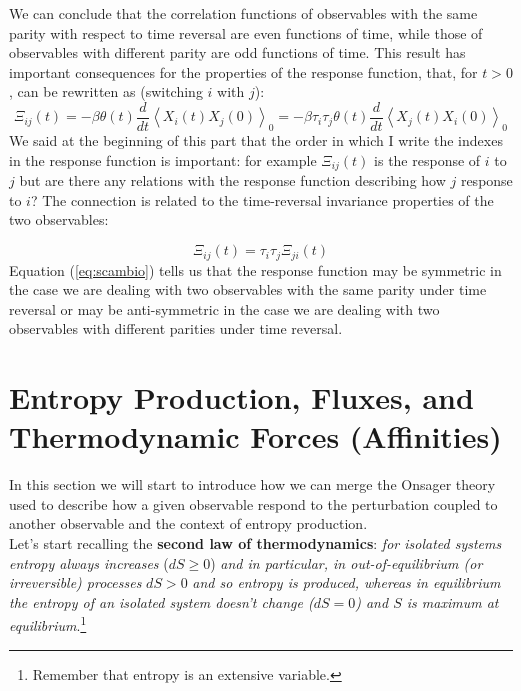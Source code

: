 \documentclass[\main/main.tex]{subfiles}
\begin{document}
We can conclude that the correlation functions of observables with the same parity with
respect to time reversal are even functions of time, while those of observables with different
parity are odd functions of time. This result has important consequences for the properties
of the response function, that, for $t > 0$, can be rewritten as (switching $i$ with $j$):
\begin{equation}
 \Xi_{i j}(t)=-\beta \theta(t) \frac{d}{d t}\left\langle X_{i}(t) X_{j}(0)\right\rangle_{0}=-\beta \tau_{i} \tau_{j} \theta(t) \frac{d}{d t}\left\langle X_{j}(t) X_{i}(0)\right\rangle_{0}   
\end{equation}
We said at the beginning of this part that the order in which I write the indexes in the response function is important: for example $\Xi_{ij}(t)$ is the response of $i$ to $j$ but are there any relations with the response function describing how $j$ response to $i$? The connection is related to the time-reversal invariance properties of the two observables:

\begin{equation}
    \boxed{\Xi_{ij}(t)=\tau_i\tau_j\Xi_{ji}(t)}
    \label{eq:scambio}
\end{equation}
Equation (\ref{eq:scambio}) tells us that the response function may be symmetric in the case we are dealing with two observables with the same parity under time reversal or may be anti-symmetric in the case we are dealing with two observables with different parities under time reversal.

\section{Entropy Production, Fluxes, and Thermodynamic Forces (Affinities)}
In this section we will start to introduce how we can merge the Onsager theory used to describe how a given observable respond to the perturbation coupled to another observable and the context of entropy production. \\

Let's start recalling the \textbf{second law of thermodynamics}: \textit{for isolated systems entropy always increases} ($dS\geq 0$) \textit{and in particular, in out-of-equilibrium (or irreversible) processes} $dS>0$ \textit{and so entropy is produced, whereas in equilibrium the entropy of an isolated system doesn't change ($dS=0$) and $S$ is maximum at equilibrium}.\footnote{Remember that entropy is an extensive variable.} \\
\end{document}
